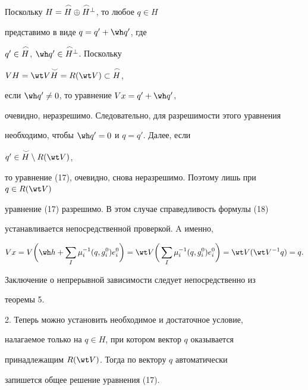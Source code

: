 \begin{pf} 


Поскольку $H=\overset{\,\frown}{H}{}\oplus\overset{\,\frown}{H}{}^\bot$, то любое $q\in H$ 


представимо в виде $q=q'+\wh q'$, где 


$q'\in\overset{\,\frown}{H}{}$, $\wh q'\in\up{\frown}{H}^\bot$. Поскольку 


$V H=\wt V\up{\smile}{H}=R(\wt V)\subset\up{\frown}{H}$, 


если $\wh q'\ne0$, то уравнение $V x=q'+\wh q'$, 


очевидно, неразрешимо. Следовательно, для разрешимости этого уравнения 


необходимо, чтобы $\wh q'=0$ и $q=q'$. Далее, если 


$q'\in\up{\smile}{H}\setminus R(\wt V)$, 


то уравнение (17), очевидно, снова неразрешимо. Поэтому лишь при $q\in 


R(\wt V)$ 


уравнение (17) разрешимо. В этом случае справедливость формулы (18) 


устанавливается непосредственной проверкой. A именно, 


$$ 


V x=V\bigg(\wh h+\sum_I \mu^{-1}_i(q,g^0_i)e^0_i\bigg)= 


\wt V\bigg(\sum_I \mu^{-1}_i(q,g^0_i)e^0_i\bigg)= 


\wt V(\wt V^{-1}q)=q. 


$$ 


Заключение о непрерывной зависимости следует непосредственно из 


теоремы 5. 


\end{pf} 


 


2. Теперь можно установить необходимое и достаточное условие, 


налагаемое только на $q\in H$, при котором вектор $q$ оказывается 


принадлежащим $R(\wt V)$. Тогда по вектору $q$ автоматически 


запишется общее решение уравнения (17). 


 


